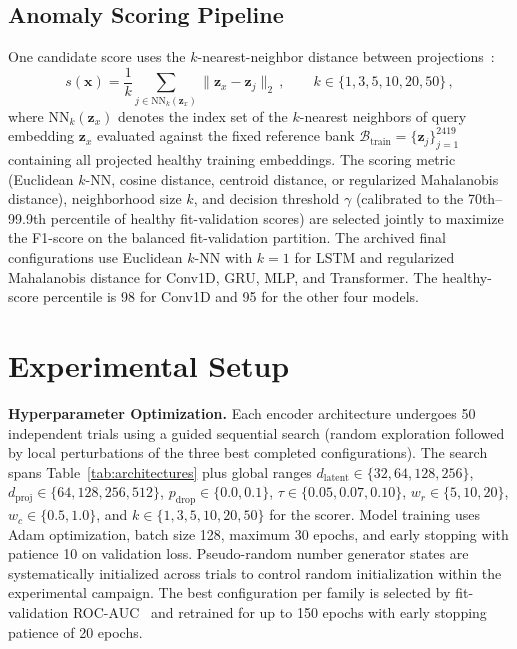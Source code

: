 \documentclass[11pt,a4paper]{article}
\begin{document}
\subsection{Anomaly Scoring Pipeline}
One candidate score uses the $k$-nearest-neighbor distance between projections~\cite{cover1967knn}:
\begin{equation}
s(\mathbf{x}) = \frac{1}{k} \sum_{j \in \mathrm{NN}_k(\mathbf{z}_x)} \|\mathbf{z}_x - \mathbf{z}_j\|_2\,, \qquad k \in \{1, 3, 5, 10, 20, 50\}\,,
\label{eq:knn-score}
\end{equation}
where $\mathrm{NN}_k(\mathbf{z}_x)$ denotes the index set of the $k$-nearest neighbors of query embedding $\mathbf{z}_x$ evaluated against the fixed reference bank $\mathcal{B}_{\mathrm{train}} = \{\mathbf{z}_j\}_{j=1}^{2419}$ containing all projected healthy training embeddings. The scoring metric (Euclidean $k$-NN, cosine distance, centroid distance, or regularized Mahalanobis distance), neighborhood size $k$, and decision threshold $\gamma$ (calibrated to the 70th--99.9th percentile of healthy fit-validation scores) are selected jointly to maximize the F1-score on the balanced fit-validation partition. The archived final configurations use Euclidean $k$-NN with $k=1$ for LSTM and regularized Mahalanobis distance for Conv1D, GRU, MLP, and Transformer. The healthy-score percentile is 98 for Conv1D and 95 for the other four models.

\section{Experimental Setup}
\label{sec:setup}

\textbf{Hyperparameter Optimization.} Each encoder architecture undergoes 50 independent trials using a guided sequential search (random exploration followed by local perturbations of the three best completed configurations). The search spans Table~\ref{tab:architectures} plus global ranges $d_{\mathrm{latent}}\in\{32,64,128,256\}$, $d_{\mathrm{proj}}\in\{64,128,256,512\}$, $p_{\mathrm{drop}}\in\{0.0,0.1\}$, $\tau\in\{0.05,0.07,0.10\}$, $w_{r}\in\{5,10,20\}$, $w_{c}\in\{0.5,1.0\}$, and $k\in\{1,3,5,10,20,50\}$ for the scorer. Model training uses Adam optimization, batch size 128, maximum 30 epochs, and early stopping with patience 10 on validation loss. Pseudo-random number generator states are systematically initialized across trials to control random initialization within the experimental campaign. The best configuration per family is selected by fit-validation ROC-AUC~\cite{fawcett2006roc} and retrained for up to 150 epochs with early stopping patience of 20 epochs.
\end{document}
